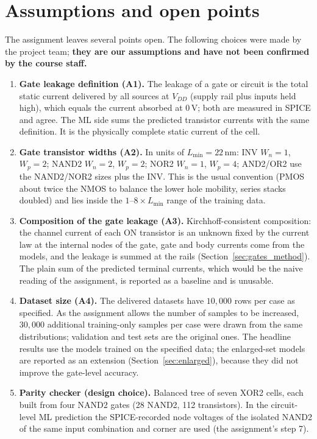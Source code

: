 \section{Assumptions and open points}\label{app:assumptions}
The assignment leaves several points open. The following choices were made by the project team; \textbf{they are our assumptions and have not been confirmed by the course staff.}
\begin{enumerate}[nosep]
  \item \textbf{Gate leakage definition (A1).} The leakage of a gate or circuit is the total static current delivered by all sources at $V_{DD}$ (supply rail plus inputs held high), which equals the
        current absorbed at $0\,$V; both are measured in SPICE and agree. The ML side sums the predicted transistor currents with the same definition. It is the physically complete static current of the cell.
  \item \textbf{Gate transistor widths (A2).} In units of $L_{\min}=22\,\mathrm{nm}$: INV $W_n=1$, $W_p=2$; NAND2 $W_n=2$, $W_p=2$; NOR2 $W_n=1$, $W_p=4$; AND2/OR2 use the NAND2/NOR2 sizes plus the INV.
        This is the usual convention (PMOS about twice the NMOS to balance the lower hole mobility, series stacks doubled) and lies inside the $1$--$8\times L_{\min}$ range of the training data.
  \item \textbf{Composition of the gate leakage (A3).} Kirchhoff-consistent composition: the channel current of each ON transistor is an unknown fixed by the current law at the internal nodes of the gate, gate and body currents come from the models, and the leakage is summed at the rails
        (Section~\ref{sec:gates_method}). The plain sum of the predicted terminal currents, which would be the naive reading of the assignment, is reported as a baseline and is unusable.
  \item \textbf{Dataset size (A4).} The delivered datasets have $10{,}000$ rows per case as specified. As the assignment allows the number of samples to be increased, $30{,}000$ additional training-only samples per case were drawn from the same distributions; validation and test sets are the original ones. The headline results use the models trained on the specified data; the enlarged-set models are reported as an extension (Section~\ref{sec:enlarged}), because they did not improve the gate-level accuracy.
  \item \textbf{Parity checker (design choice).} Balanced tree of seven XOR2 cells, each built from four NAND2 gates (28 NAND2, 112 transistors). In the circuit-level ML prediction the SPICE-recorded node voltages of the isolated NAND2 of the same input combination and corner are used (the assignment's step 7).

\end{enumerate}
